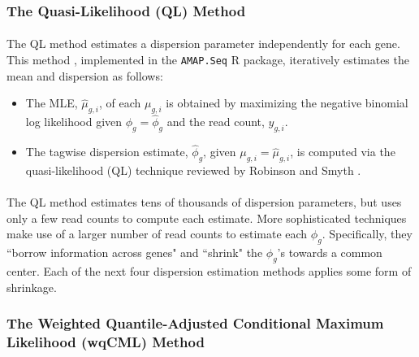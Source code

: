 \documentclass[10pt]{article}
\providecommand{\wh}[1]{\widehat{#1}}
\begin{document}
\subsubsection*{The Quasi-Likelihood (QL) Method} \label{subsec:amap}

\paragraph{} \indent The QL method estimates a dispersion parameter independently for each gene. This method \cite{amap_m} \cite{amap}, implemented in the {\tt AMAP.Seq} R package, iteratively estimates the mean and dispersion as follows:

\begin{itemize}
\item The MLE, $\wh{\mu}_{g, i}$, of each $\mu_{g, i}$ is obtained by maximizing the negative binomial log likelihood given $\phi_g = \wh{\phi}_g$ and the read count, $y_{g, i}$.
\item The tagwise dispersion estimate, $\wh{\phi}_g$, given $\mu_{g, i} = \wh{\mu}_{g, i}$, is computed via the quasi-likelihood (QL) technique reviewed by Robinson and Smyth \cite{rs08}.
\end{itemize}

\paragraph{} \indent The QL method estimates tens of thousands of dispersion parameters, but uses only a few read counts to compute each estimate. More sophisticated techniques make use of a larger number of read counts to estimate each $\phi_g$. Specifically, they ``borrow information across genes" and ``shrink" the $\phi_g$'s towards a common center. Each of the next four dispersion estimation methods applies some form of shrinkage.


\subsubsection*{The Weighted Quantile-Adjusted Conditional Maximum Likelihood (wqCML) Method} \label{subsec:qcml}
\end{document}
